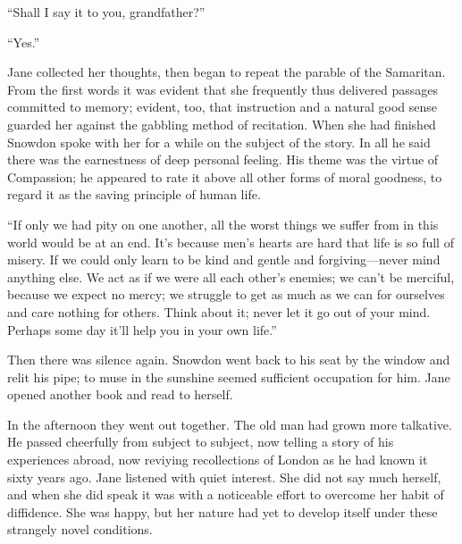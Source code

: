 ``Shall I say it to you, grandfather?''

``Yes.''

Jane collected her thoughts, then began to repeat the parable of the
Samaritan. From the first words it was evident that she frequently thus
delivered passages committed to memory; evident, too, that instruction
and a natural good sense guarded her against the gabbling method of
recitation. When she had finished Snowdon spoke with her for a while on
the subject of the story. In all he said there was
{\protect\hypertarget{242}{}{}}the earnestness of deep personal feeling.
His theme was the virtue of Compassion; he appeared to rate it above all
other forms of moral goodness, to regard it as the saving principle of
human life.

``If only we had pity on one another, all the worst things we suffer
from in this world would be at an end. It's because men's hearts are
hard that life is so full of misery. If we could only learn to be kind
and gentle and forgiving---never mind anything else. We act as if we
were all each other's enemies; we can't be merciful, because we expect
no mercy; we struggle to get as much as we can for ourselves and care
nothing for others. Think about it; never let it go out of your mind.
Perhaps some day it'll help you in your own life.''

Then there was silence again. Snowdon went back to his seat by the
window and relit his pipe; to muse in the sunshine seemed sufficient
occupation for him. Jane opened another book and read to herself.

In the afternoon they went out together.
{\protect\hypertarget{243}{}{}}The old man had grown more talkative. He
passed cheerfully from subject to subject, now telling a story of his
experiences abroad, now reviying recollections of London as he had known
it sixty years ago. Jane listened with quiet interest. She did not say
much herself, and when she did speak it was with a noticeable effort to
overcome her habit of diffidence. She was happy, but her nature had yet
to develop itself under these strangely novel conditions.

